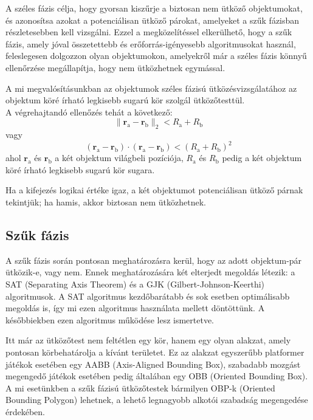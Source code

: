 \documentclass[12pt]{report}
\begin{document}
A széles fázis célja, hogy gyorsan kiszűrje a biztosan nem ütköző objektumokat, és azonosítsa azokat a potenciálisan ütköző párokat, amelyeket a szűk fázisban részletesebben kell vizsgálni. Ezzel a megközelítéssel elkerülhető, hogy a szűk fázis, amely jóval összetettebb és erőforrás-igényesebb algoritmusokat használ, feleslegesen dolgozzon olyan objektumokon, amelyekről már a széles fázis könnyű ellenőrzése megállapítja, hogy nem ütközhetnek egymással.

A mi megvalósításunkban az objektumok széles fázisú ütközésvizsgálatához az objektum köré írható legkisebb sugarú kör szolgál ütközőtesttül.\\
A végrehajtandó ellenőzés tehát a következő:
\[
    \|\mathbf{r}_{\text{a}} - \mathbf{r}_{\text{b}}\|_2 < R_{\text{a}} + R_{\text{b}}
\]
vagy
\[
    (\mathbf{r}_{\text{a}} - \mathbf{r}_{\text{b}}) \cdot (\mathbf{r}_{\text{a}} - \mathbf{r}_{\text{b}}) < (R_{\text{a}} + R_{\text{b}})^2 \tag{2} \label{eq:distance}
\]
ahol $\mathbf{r}_{\text{a}}$ és $\mathbf{r}_{\text{b}}$ a két objektum világbeli pozíciója, $R_{\text{a}}$ és $R_{\text{b}}$ pedig a két objektum köré írható legkisebb sugarú kör sugara.

Ha a kifejezés logikai értéke igaz, a két objektumot potenciálisan ütköző párnak tekintjük; ha hamis, akkor biztosan nem ütközhetnek.


\subsection{Szűk fázis}

A szűk fázis során pontosan meghatározásra kerül, hogy az adott objektum-pár ütközik-e, vagy nem. Ennek meghatározására két elterjedt megoldás létezik: a SAT (Separating Axis Theorem) és a GJK (Gilbert-Johnson-Keerthi) algoritmusok. A SAT algoritmus kezdőbarátabb és sok esetben optimálisabb megoldás is, így mi ezen algoritmus használata mellett döntöttünk. A későbbiekben ezen algoritmus működése lesz ismertetve.

Itt már az ütközőtest nem feltétlen egy kör, hanem egy olyan alakzat, amely pontosan körbehatárolja a kívánt területet. Ez az alakzat egyszerűbb platformer játékok esetében egy AABB (Axis-Aligned Bounding Box), szabadabb mozgást megengedő játékok esetében pedig általában egy OBB (Oriented Bounding Box). A mi esetünkben a szűk fázisú ütközőtestek bármilyen OBP-k (Oriented Bounding Polygon) lehetnek, a lehető legnagyobb alkotói szabadság megengedése érdekében.
\end{document}
